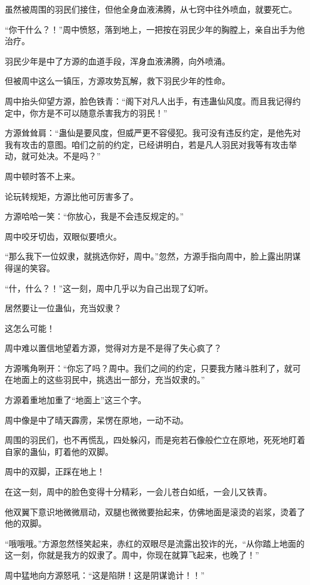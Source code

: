\begin{this_body}
虽然被周围的羽民们接住，但他全身血液沸腾，从七窍中往外喷血，就要死亡。

“你干什么？！”周中愤怒，落到地上，一把按在羽民少年的胸膛上，亲自出手为他治疗。

羽民少年是中了方源的血道手段，浑身血液沸腾，向外喷涌。

但被周中这么一镇压，方源攻势瓦解，救下羽民少年的性命。

周中抬头仰望方源，脸色铁青：“阁下对凡人出手，有违蛊仙风度。而且我记得约定中，你方是不可以随意杀害我方的羽民！”

方源耸耸肩：“蛊仙是要风度，但威严更不容侵犯。我可没有违反约定，是他先对我有攻击的意图。咱们之前的约定，已经讲明白，若是凡人羽民对我等有攻击举动，就可处决。不是吗？”

周中顿时答不上来。

论玩转规矩，方源比他可厉害多了。

方源哈哈一笑：“你放心，我是不会违反规定的。”

周中咬牙切齿，双眼似要喷火。

“那么我下一位奴隶，就挑选你好，周中。”忽然，方源手指向周中，脸上露出阴谋得逞的笑容。

“什，什么？！”这一刻，周中几乎以为自己出现了幻听。

居然要让一位蛊仙，充当奴隶？

这怎么可能！

周中难以置信地望着方源，觉得对方是不是得了失心疯了？

方源嘴角咧开：“你忘了吗？周中。我们之间的约定，只要我方赌斗胜利了，就可在地面上的这些羽民中，挑选出一部分，充当奴隶的。”

方源着重地加重了“地面上”这三个字。

周中像是中了晴天霹雳，呆愣在原地，一动不动。

周围的羽民们，也不再慌乱，四处躲闪，而是宛若石像般伫立在原地，死死地盯着自家的蛊仙，盯着他的双脚。

周中的双脚，正踩在地上！

在这一刻，周中的脸色变得十分精彩，一会儿苍白如纸，一会儿又铁青。

他双翼下意识地微微扇动，双腿也微微要抬起来，仿佛地面是滚烫的岩浆，烫着了他的双脚。

“哦哦哦。”方源忽然怪笑起来，赤红的双眼尽是流露出狡诈的光，“从你踏上地面的这一刻，你就是我方的奴隶了。周中，你现在就算飞起来，也晚了！”

周中猛地向方源怒吼：“这是陷阱！这是阴谋诡计！！”


\end{this_body}
